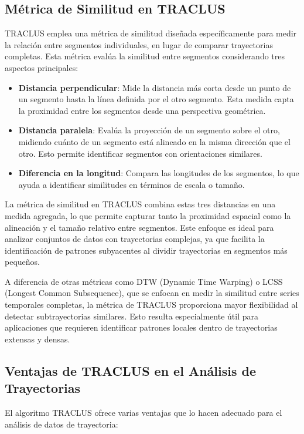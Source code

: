 \subsection*{Métrica de Similitud en TRACLUS}

TRACLUS emplea una métrica de similitud diseñada específicamente para medir la relación entre segmentos individuales, en lugar de comparar trayectorias completas. Esta métrica evalúa la similitud entre segmentos considerando tres aspectos principales:

\begin{itemize}
    \item \textbf{Distancia perpendicular}: Mide la distancia más corta desde un punto de un segmento hasta la línea definida por el otro segmento. Esta medida capta la proximidad entre los segmentos desde una perspectiva geométrica.
    \item \textbf{Distancia paralela}: Evalúa la proyección de un segmento sobre el otro, midiendo cuánto de un segmento está alineado en la misma dirección que el otro. Esto permite identificar segmentos con orientaciones similares.
    \item \textbf{Diferencia en la longitud}: Compara las longitudes de los segmentos, lo que ayuda a identificar similitudes en términos de escala o tamaño.
\end{itemize}

La métrica de similitud en TRACLUS combina estas tres distancias en una medida agregada, lo que permite capturar tanto la proximidad espacial como la alineación y el tamaño relativo entre segmentos. Este enfoque es ideal para analizar conjuntos de datos con trayectorias complejas, ya que facilita la identificación de patrones subyacentes al dividir trayectorias en segmentos más pequeños.

A diferencia de otras métricas como DTW (Dynamic Time Warping) o LCSS (Longest Common Subsequence), que se enfocan en medir la similitud entre series temporales completas, la métrica de TRACLUS proporciona mayor flexibilidad al detectar subtrayectorias similares. Esto resulta especialmente útil para aplicaciones que requieren identificar patrones locales dentro de trayectorias extensas y densas.

\subsection*{Ventajas de TRACLUS en el Análisis de Trayectorias}
El algoritmo TRACLUS ofrece varias ventajas que lo hacen adecuado para el análisis de datos de trayectoria:

